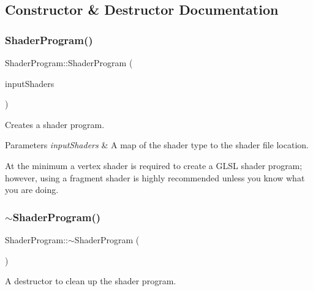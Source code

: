 \subsection{Constructor \& Destructor Documentation}
\hypertarget{class_shader_program_aba2db5734b2f70cc34078126ad279588}{}\label{class_shader_program_aba2db5734b2f70cc34078126ad279588} 
\subsubsection{\texorpdfstring{Shader\+Program()}{ShaderProgram()}}
{\footnotesize\ttfamily Shader\+Program\+::\+Shader\+Program (\begin{DoxyParamCaption}\item[{const std\+::unordered\+\_\+map$<$ G\+Lenum, std\+::string $>$ \&}]{input\+Shaders }\end{DoxyParamCaption})}



Creates a shader program. 


\begin{DoxyParams}{Parameters}
{\em input\+Shaders} & A map of the shader type to the shader file location.\\
\hline
\end{DoxyParams}
At the minimum a vertex shader is required to create a G\+L\+SL shader program; however, using a fragment shader is highly recommended unless you know what you are doing. \hypertarget{class_shader_program_a2d2eadcfc48cc2e2ddb82aba70553a9f}{}\label{class_shader_program_a2d2eadcfc48cc2e2ddb82aba70553a9f} 
\subsubsection{\texorpdfstring{$\sim$\+Shader\+Program()}{~ShaderProgram()}}
{\footnotesize\ttfamily Shader\+Program\+::$\sim$\+Shader\+Program (\begin{DoxyParamCaption}{ }\end{DoxyParamCaption})\hspace{0.3cm}{\ttfamily [virtual]}}



A destructor to clean up the shader program. 



